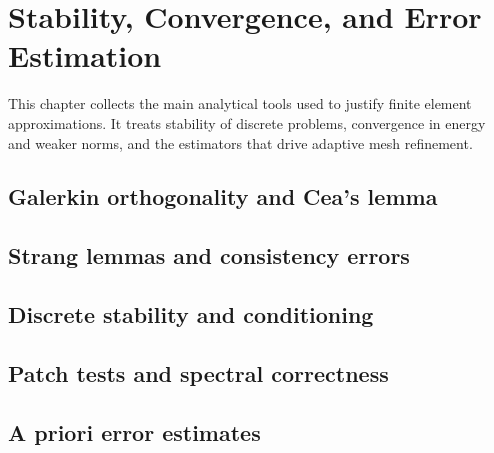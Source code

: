 \chapter{Stability, Convergence, and Error Estimation}
\label{ch:error_analysis}

This chapter collects the main analytical tools used to justify finite element
approximations. It treats stability of discrete problems, convergence in energy
and weaker norms, and the estimators that drive adaptive mesh refinement.

\section{Galerkin orthogonality and Cea's lemma}
\label{sec:error_analysis:cea}


\section{Strang lemmas and consistency errors}
\label{sec:error_analysis:strang}


\section{Discrete stability and conditioning}
\label{sec:error_analysis:stability}


\section{Patch tests and spectral correctness}
\label{sec:error_analysis:patch_tests}


\section{A priori error estimates}
\label{sec:error_analysis:apriori}


